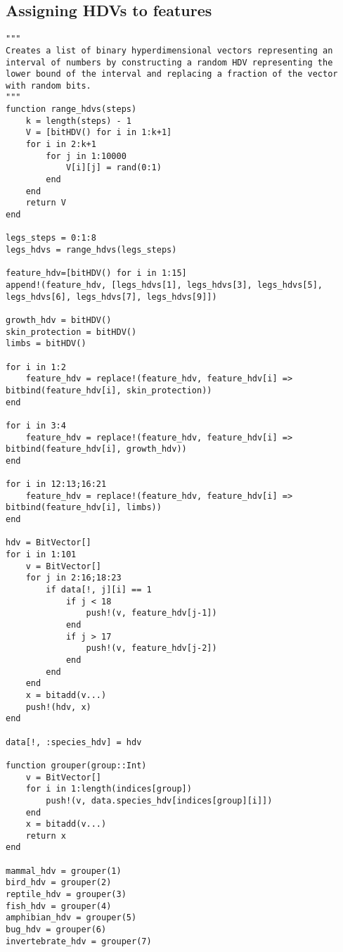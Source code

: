 \subsection{Assigning HDVs to features}
\begin{verbatim}
"""
Creates a list of binary hyperdimensional vectors representing an interval of numbers by constructing a random HDV representing the lower bound of the interval and replacing a fraction of the vector with random bits.
"""
function range_hdvs(steps)
	k = length(steps) - 1
	V = [bitHDV() for i in 1:k+1]
	for i in 2:k+1
		for j in 1:10000
			V[i][j] = rand(0:1)
		end
	end
	return V
end

legs_steps = 0:1:8
legs_hdvs = range_hdvs(legs_steps)

feature_hdv=[bitHDV() for i in 1:15]
append!(feature_hdv, [legs_hdvs[1], legs_hdvs[3], legs_hdvs[5], legs_hdvs[6], legs_hdvs[7], legs_hdvs[9]])

growth_hdv = bitHDV()
skin_protection = bitHDV()
limbs = bitHDV()

for i in 1:2
    feature_hdv = replace!(feature_hdv, feature_hdv[i] => bitbind(feature_hdv[i], skin_protection))
end

for i in 3:4
    feature_hdv = replace!(feature_hdv, feature_hdv[i] => bitbind(feature_hdv[i], growth_hdv))
end

for i in 12:13;16:21
    feature_hdv = replace!(feature_hdv, feature_hdv[i] => bitbind(feature_hdv[i], limbs))
end

hdv = BitVector[]
for i in 1:101
    v = BitVector[]
    for j in 2:16;18:23
        if data[!, j][i] == 1
            if j < 18
                push!(v, feature_hdv[j-1])
            end
            if j > 17
                push!(v, feature_hdv[j-2])
            end
        end
    end
    x = bitadd(v...)
    push!(hdv, x)
end

data[!, :species_hdv] = hdv

function grouper(group::Int)
    v = BitVector[]
    for i in 1:length(indices[group])
        push!(v, data.species_hdv[indices[group][i]])
    end
    x = bitadd(v...)
    return x
end

mammal_hdv = grouper(1)
bird_hdv = grouper(2)
reptile_hdv = grouper(3)
fish_hdv = grouper(4)
amphibian_hdv = grouper(5)
bug_hdv = grouper(6)
invertebrate_hdv = grouper(7)
\end{verbatim}
